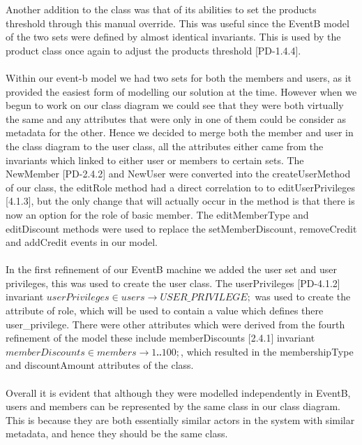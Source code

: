 \documentclass[a4paper]{article}
\begin{document}
Another addition to the class was that of its abilities to set the products threshold through this manual override. This was useful since the EventB model of the two sets were defined by almost identical invariants. This is used by the product class once again to adjust the products threshold [PD-1.4.4].
\\\\
Within our event-b model we had two sets for both the members and users, as it provided the easiest form of modelling our solution at the time. However when we begun to work on our class diagram we could see that they were both virtually the same and any attributes that were only in one of them could be consider as metadata for the other. Hence we decided to merge both the member and user in the class diagram to the user class, all the attributes either came from the invariants which linked to either user or members to certain sets. The NewMember [PD-2.4.2] and NewUser were converted into the createUserMethod of our class, the editRole method had a direct correlation to to editUserPrivileges [4.1.3], but the only change that will actually occur in the method is that there is now an option for the role of basic member. The editMemberType and editDiscount methods were used to replace the setMemberDiscount, removeCredit and addCredit events in our model.
\\\\
In the first refinement of our EventB machine we added the user set and user privileges, this was used to create the user class. The userPrivileges [PD-4.1.2] invariant \(userPrivileges \in users \to USER\_PRIVILEGE; \) was used to create the attribute of role, which will be used to contain a value which defines there user\_privilege. There were other attributes which were derived from the fourth refinement of the model these include memberDiscounts [2.4.1] invariant \(memberDiscounts \in members \to 1‥100; \), which resulted in the membershipType and discountAmount attributes of the class.
\\\\
Overall it is evident that although they were modelled independently in EventB, users and members can be represented by the same class in our class diagram. This is because they are both essentially similar actors in the system with similar metadata, and hence they should be the same class.
\\\\
\end{document}
